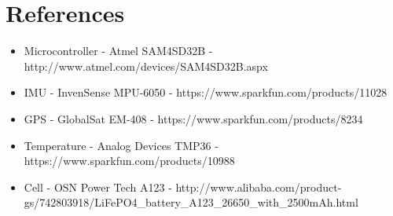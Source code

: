 \documentclass[a4paper, twoside]{article}
\begin{document}
\section{References}
\begin{itemize}
	\item{Microcontroller - Atmel SAM4SD32B - http://www.atmel.com/devices/SAM4SD32B.aspx}
	\item{IMU - InvenSense MPU-6050 - https://www.sparkfun.com/products/11028}
	\item{GPS - GlobalSat EM-408 - https://www.sparkfun.com/products/8234}
	\item{Temperature - Analog Devices TMP36 - https://www.sparkfun.com/products/10988}
	\item{Cell - OSN Power Tech A123 -
		http://www.alibaba.com/product-gs/742803918/LiFePO4\_battery\_A123\_26650\_with\_2500mAh.html}
\end{itemize}
\end{document}
